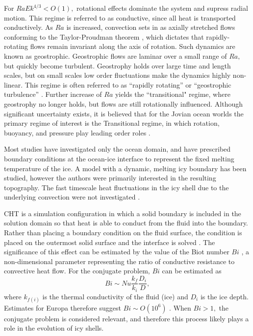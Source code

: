 \documentclass{article}
\def\lb{\left(}
\def\rb{\right)}
\begin{document}
For $RaEk^{4/3}<O\lb 1\rb,$  rotational effects dominate the system and supress radial motion. This regime is referred to as conductive, since all heat is transported conductively. As $Ra$ is increased, convection sets in as axially stretched flows conforming to the Taylor-Proudman theorem \citep{gB53}, which dictates that rapidly-rotating flows remain invariant along the axis of rotation. Such dynamics are known as geostrophic.
Geostrophic flows are laminar over a small range of $Ra,$ but quickly become turbulent. Geostrophy holds over large time and length scales, but on small scales low order fluctuations make the dynamics highly non-linear.
This regime is often referred to as ``rapidly rotating'' or ``geostrophic turbulence'' \citep{kJ12}.
Further increase of $Ra$ yields the ``transitional" regime, where geostrophy no longer holds, but flows are still rotationally influenced.
Although significant uncertainty exists, it is believed that for the Jovian ocean worlds the primary regime of interest is the Transitional regime, in which rotation, buoyancy, and pressure play leading order roles \citep{dL23,tG16}.

Most studies \citep{kS19, dL23} have investigated only the ocean domain, and have prescribed boundary conditions at the ocean-ice interface to represent the fixed melting temperature of the ice. 
A model with a dynamic, melting icy boundary has been studied, however the authors were primarily interested in the resulting topography. The fast timescale heat fluctuations in the icy shell due to the underlying convection were not investigated \citep{jK24}. 

CHT is a simulation configuration in which a solid boundary is included in the solution domain so that heat is able to conduct from the fluid into the boundary. Rather than placing a boundary condition on the fluid surface, the condition is placed on the outermost solid surface and the interface is solved \citep{dA09}. The significance of this effect can be estimated by the value of the Biot number $Bi$ \citep{dA09,jL24}, a non-dimensional parameter representing the ratio of conductive resistance to convective heat flow. For the conjugate problem, $Bi$ can be estimated as
\[Bi \sim Nu\frac{k_{f}}{k_{i}}\frac{D_{i}}{D},\]
where $k_{f\lb i\rb }$ is the thermal conductivity of the fluid (ice) and $D_{i}$ is the ice depth.
Estimates for Europa therefore suggest $Bi \sim O\lb 10^{6}\rb$ \citep{dL23}. When $Bi>1,$ the conjugate problem is considered relevant, and therefore this process likely plays a role in the evolution of icy shells.
\end{document}
